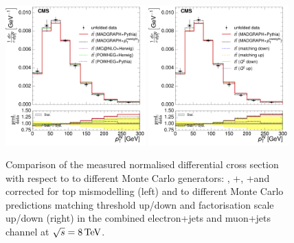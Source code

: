 \begin{figure}[hbtp]
    \centering
     \includegraphics[width=0.48\textwidth]{Chapters/04_Analysis/04b_XSections/images/results/8TeV/WPT/central/normalised_xsection_combined_different_generators.pdf}\hfill
     \includegraphics[width=0.48\textwidth]{Chapters/04_Analysis/04b_XSections/images/results/8TeV/WPT/central/normalised_xsection_combined_systematics_shifts.pdf}\hfill
     \caption{Comparison of the measured normalised differential cross section with respect to \wpt to
     different Monte Carlo generators: \MADGRAPH, \POWHEG+\HERWIG, \POWHEG+\PYTHIA and \MADGRAPH corrected for
     top \pt mismodelling (left) and to different Monte Carlo predictions matching threshold up/down and
     factorisation scale up/down (right) in the combined electron+jets and muon+jets channel at
     $\sqrt{s}=8\,\text{Te\hspace{-.08em}V}$.}
     \label{fig:result_MT_8TeV_combined}
\end{figure}

